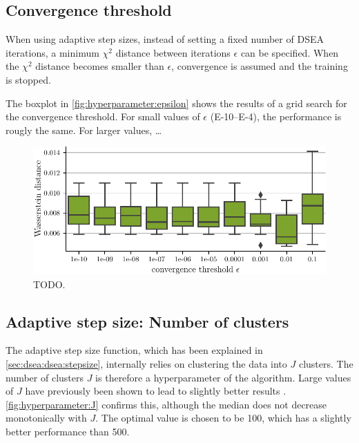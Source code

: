\subsection{Convergence threshold}
When using adaptive step sizes,
instead of setting a fixed number of DSEA iterations,
a minimum $\chi^2$ distance between iterations $\epsilon$
can be specified.
When the $\chi^2$ distance becomes smaller than $\epsilon$,
convergence is assumed and the training is stopped.

The boxplot in \autoref{fig:hyperparameter:epsilon} shows the results of a grid search for the convergence threshold.
For small values of $\epsilon$
  (\numrange{E-10}{E-4}),
the performance is rougly the same.
For larger values, …

\begin{figure}
  \centering
  \includegraphics[width=\textwidth]{content/plots/hyperparam/epsilon_vs_wd_boxplot_lessheight.pdf}
  \caption{TODO.}
  \label{fig:hyperparameter:epsilon}
\end{figure}


\subsection{Adaptive step size: Number of clusters}
The adaptive step size function,
  which has been explained in \autoref{sec:dsea:dsea:stepsize},
internally relies on clustering the data into $J$ clusters.
The number of clusters $J$ is therefore a hyperparameter of the algorithm.
%
Large values of $J$ have previously been shown to lead to slightly better results \cite{dsea_mirko}.
\autoref{fig:hyperparameter:J} confirms this,
although the median does not decrease monotonically with $J$.
The optimal value is chosen to be \num{100},
which has a slightly better performance than \num{500}.


